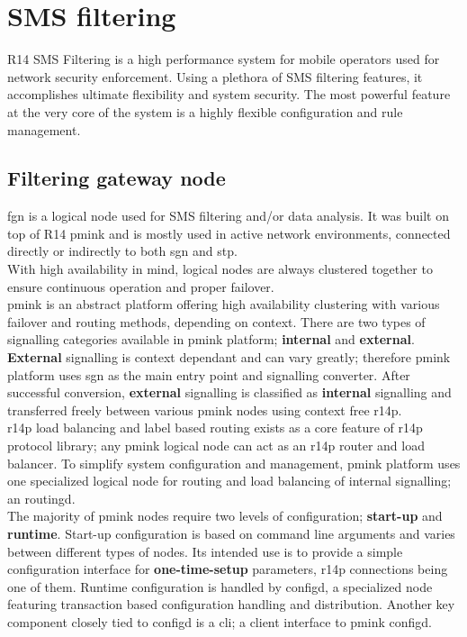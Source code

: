 \documentclass[a4paper,latin]{paper}
\begin{document}
\section{SMS filtering}
R14 SMS Filtering is a high performance system for mobile operators used for network security enforcement. 
Using a plethora of SMS filtering features, it accomplishes ultimate flexibility and system security. 
The most powerful feature at the very core of the system is a highly flexible configuration and rule management.

\subsection{Filtering gateway node}\label{SECTION_8_1}
\acrfull{fgn} is a logical \gls{node} used for SMS filtering and/or data analysis. It was built on top of 
R14 \acrfull{pmink} and is mostly used in active network environments, connected directly or indirectly to both \acrfull{sgn} 
and \acrfull{stp}.\\

With high availability in mind, logical \glspl{node} are always clustered together to ensure continuous operation 
and proper failover.\\

\acrfull{pmink} is an abstract platform offering high availability clustering with various failover and routing methods,
depending on context. There are two types of signalling categories available in \acrshort{pmink} platform; 
\textbf{internal} and \textbf{external}. \textbf{External} signalling is context dependant and can vary greatly; 
therefore \acrshort{pmink} platform uses \acrfull{sgn} as the main entry point and signalling converter.
After successful conversion, \textbf{external} signalling is classified as \textbf{internal} signalling and transferred 
freely between various \acrshort{pmink} nodes using context free \acrfull{r14p}.\\

\acrshort{r14p} load balancing and label based routing exists as a core feature of \acrshort{r14p} protocol library; 
any \acrshort{pmink} logical node can act as an \acrshort{r14p} router and load balancer. To simplify system 
configuration and management, \acrshort{pmink} platform uses one specialized logical node for routing and load balancing 
of internal signalling; an \acrfull{routingd}.\\

The majority of \acrshort{pmink} \glspl{node} require two levels of configuration; \textbf{start-up} and \textbf{runtime}.
Start-up configuration is based on command line arguments and varies between different types of \glspl{node}. Its intended use is to
provide a simple configuration interface for \textbf{one-time-setup} parameters, \acrshort{r14p} connections being one of them. 
Runtime configuration is handled by \acrfull{configd}, a specialized \gls{node} featuring transaction based configuration handling
and distribution. Another key component closely tied to \acrfull{configd} is a \acrfull{cli}; a client interface to 
\acrshort{pmink} \acrshort{configd}.\\
\end{document}
